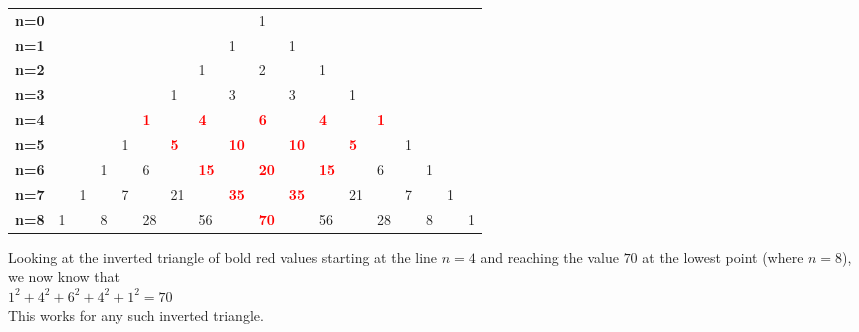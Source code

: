 \begin{table}[!hbp]
\begin{tabular}{llllllllllllllllll}
\textbf{n=0} &   &   &   &   &            &            &             &             & 1           &             &             &            &            &   &   &   &   \\
\textbf{n=1} &   &   &   &   &            &            &             & 1           &             & 1           &             &            &            &   &   &   &   \\
\textbf{n=2} &   &   &   &   &            &            & 1           &             & 2           &             & 1           &            &            &   &   &   &   \\
\textbf{n=3} &   &   &   &   &            & 1          &             & 3           &             & 3           &             & 1          &            &   &   &   &   \\
\textbf{n=4} &   &   &   &   & \textcolor{red}{\textbf{1}} &            & \textcolor{red}{\textbf{4}}  &             & \textcolor{red}{\textbf{6}}  &             & \textcolor{red}{\textbf{4}}  &            & \textcolor{red}{\textbf{1}} &   &   &   &   \\
\textbf{n=5} &   &   &   & 1 &            & \textcolor{red}{\textbf{5}} &             & \textcolor{red}{\textbf{10}} &             & \textcolor{red}{\textbf{10}} &             & \textcolor{red}{\textbf{5}} &            & 1 &   &   &   \\
\textbf{n=6} &   &   & 1 &   & 6          &            & \textcolor{red}{\textbf{15}} &             & \textcolor{red}{\textbf{20}} &             & \textcolor{red}{\textbf{15}} &            & 6          &   & 1 &   &   \\
\textbf{n=7} &   & 1 &   & 7 &            & 21         &             & \textcolor{red}{\textbf{35}} &             & \textcolor{red}{\textbf{35}} &             & 21         &            & 7 &   & 1 &   \\
\textbf{n=8} & 1 &   & 8 &   & 28         &            & 56          &             & \textcolor{red}{\textbf{70}} &             & 56          &            & 28         &   & 8 &   & 1
\end{tabular}
\end{table}

Looking at the inverted triangle of bold red values starting at the line $n = 4$ and reaching the value $70$ at the lowest point (where $n=8$), we now know that \\
$1^2 + 4^2 + 6^2 + 4^2 + 1^2 = 70$ \\
This works for any such inverted triangle.  

